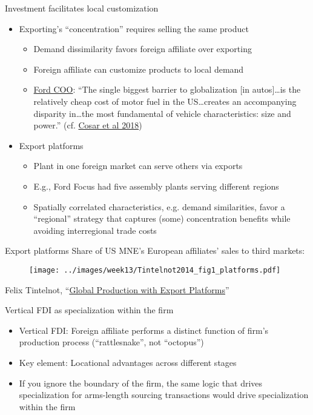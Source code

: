\documentclass[11pt,notes=hide,aspectratio=169]{beamer}
\begin{document}
\begin{frame}{Investment facilitates local customization}
\begin{itemize}
\item Exporting's ``concentration'' requires selling the same product
	\begin{itemize}
	\item Demand dissimilarity favors foreign affiliate over exporting
	\item Foreign affiliate can customize products to local demand
	\item \href{https://hbr.org/2005/12/regional-strategies-for-global-leadership}{Ford COO}: ``The single biggest barrier to globalization [in autos]\dots is the relatively cheap cost of motor fuel in the US\dots creates an accompanying disparity in\dots the most fundamental of vehicle characteristics: size and power.'' (cf. \href{https://doi.org/10.1016/j.jinteco.2017.11.001}{Cosar et al 2018})
	\end{itemize}
\item Export platforms
\begin{itemize}
	\item Plant in one foreign market can serve others via exports
	\item E.g., Ford Focus had five assembly plants serving different regions
	\item Spatially correlated characteristics, e.g. demand similarities, favor a ``regional'' strategy that captures (some) concentration benefits while avoiding interregional trade costs
\end{itemize}
\end{itemize}
\end{frame}
\begin{frame}{Export platforms}
Share of US MNE's European affiliates' sales to third markets:
\begin{center}\begin{figure}\texttt{[image: ../images/week13/Tintelnot2014\_fig1\_platforms.pdf]}\end{figure} {\footnotesize Felix Tintelnot, ``\href{https://academic.oup.com/qje/article-abstract/132/1/157/2724546}{Global Production with Export Platforms}''} \end{center}
\end{frame}
\begin{frame}{Vertical FDI as specialization within the firm}
\begin{itemize}
	\item Vertical FDI: Foreign affiliate performs a distinct function of firm's production process (``rattlesnake'', not ``octopus'')
	\item Key element: Locational advantages across different stages
	\item If you ignore the boundary of the firm, the same logic that drives specialization for arms-length sourcing transactions would drive specialization within the firm
\end{itemize}
\end{frame}
\end{document}
